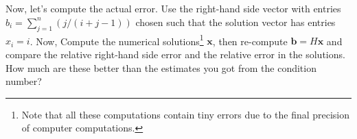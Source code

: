 \documentclass{article}%
\begin{document}
\subsection{}
  Now, let's compute the actual error. Use the right-hand side vector
  with entries $b_i = \sum_{j=1}^n(j/(i+j-1))$ chosen such that the
  solution vector has entries $x_i=i$. Now, Compute the numerical
  solutions\footnote{Note that all these computations contain tiny
    errors due to the final precision of computer computations.}
  $\boldsymbol x$, then re-compute $\boldsymbol b=H\boldsymbol x$ and
  compare the relative right-hand side error and the relative error
  in the solutions. How much are these better than the estimates you
  got from the condition number? 
    
    
\end{document}
